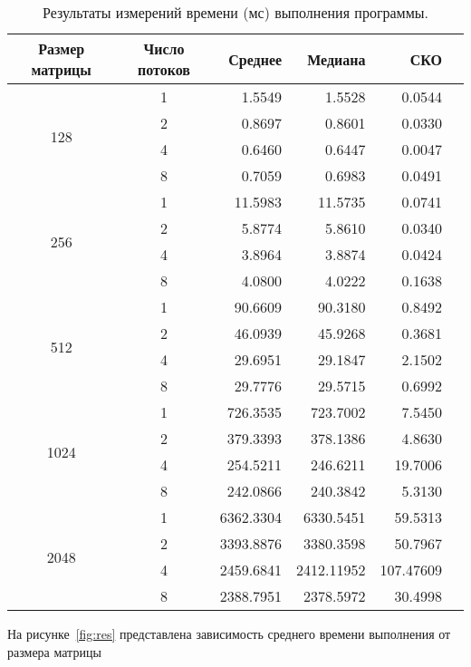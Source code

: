 \documentclass[a4paper,14pt]{extarticle}
\begin{document}
    \begin{table}[t]
        \centering
        \begin{tabular}{ccrrrr}
            \toprule
            Размер матрицы & Число потоков & Среднее & Медиана & СКО  \\
            \midrule
            \multirow{4}{*}{128} & 1 & 1.5549 & 1.5528 & 0.0544 \\
            & 2 & 0.8697 & 0.8601 & 0.0330 \\
            & 4 & 0.6460 & 0.6447 & 0.0047 \\
            & 8 & 0.7059 & 0.6983 & 0.0491 \\
            \midrule
            \multirow{4}{*}{256} & 1 & 11.5983 & 11.5735 & 0.0741 \\
            & 2 & 5.8774 & 5.8610 & 0.0340 \\
            & 4 & 3.8964 & 3.8874 & 0.0424 \\
            & 8 & 4.0800 & 4.0222 & 0.1638 \\
            \midrule
            \multirow{4}{*}{512} & 1 & 90.6609 & 90.3180 & 0.8492 \\
            & 2 & 46.0939 & 45.9268 & 0.3681 \\
            & 4 & 29.6951 & 29.1847 & 2.1502 \\
            & 8 & 29.7776 & 29.5715 & 0.6992 \\
            \midrule
            \multirow{4}{*}{1024} & 1 & 726.3535 & 723.7002 & 7.5450 \\
            & 2 & 379.3393 & 378.1386 & 4.8630  \\
            & 4 & 254.5211 & 246.6211 & 19.7006 \\
            & 8 & 242.0866 & 240.3842 & 5.3130 \\
            \midrule
            \multirow{4}{*}{2048} & 1 & 6362.3304 & 6330.5451 & 59.5313 \\
            & 2 & 3393.8876 & 3380.3598 & 50.7967 \\
            & 4 & 2459.6841 & 2412.11952 & 107.47609 \\
            & 8 & 2388.7951 & 2378.5972 & 30.4998 \\
            \bottomrule
        \end{tabular}
        \caption{Результаты измерений времени (мс) выполнения программы.}
        \label{tab:res}
    \end{table}
    На рисунке~\ref{fig:res} представлена зависимость среднего времени выполнения от размера матрицы
\end{document}
